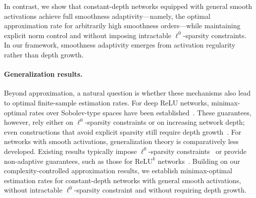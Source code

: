 \documentclass[11pt]{article}
\begin{document}
In contrast, we show that constant-depth networks equipped with general smooth activations achieve full smoothness adaptivity—namely, the optimal approximation rate for arbitrarily high smoothness orders—while maintaining explicit norm control and without imposing intractable $\ell^0$-sparsity constraints. 
In our framework, smoothness adaptivity emerges from activation regularity rather than depth growth.

\paragraph{Generalization results.}
Beyond approximation, a natural question is whether these mechanisms also lead to optimal finite-sample estimation rates. 
For deep ReLU networks, minimax-optimal rates over Sobolev-type spaces have been established~\citep{schmidt2020nonparametric,suzukiadaptivity}. 
These guarantees, however, rely either on $\ell^0$-sparsity constraints or on increasing network depth; even constructions that avoid explicit sparsity still require depth growth~\citep{kohler2021rate}. 
For networks with smooth activations, generalization theory is comparatively less developed. 
Existing results typically impose $\ell^0$-sparsity constraints~\citep{bauer2019deep,ohn2019smooth} or provide non-adaptive guarantees, such as those for $\mathrm{ReLU}^k$ networks~\citep{yang2024nonparametric,yang2025optimal}. 
Building on our complexity-controlled approximation results, we establish minimax-optimal estimation rates for constant-depth networks with general smooth activations, without intractable $\ell^0$-sparsity constraint and without requiring depth growth.
\end{document}
